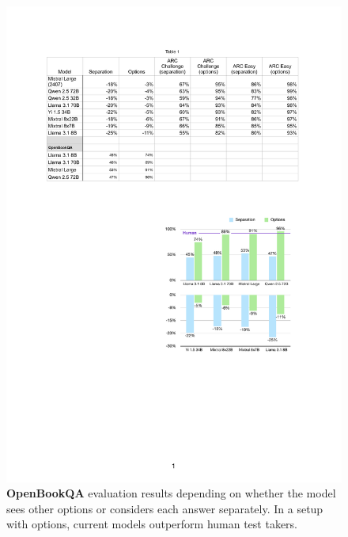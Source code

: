 \documentclass[11pt]{article}
\begin{document}
\begin{figure}[t]
    \centering
    \includegraphics[width=\linewidth]{images/openbookqa.pdf}
    \caption{{\color{snowviolet}\textbf{OpenBookQA}} evaluation results depending on whether the model sees other options or considers each answer separately. In a setup with options, current models outperform human test takers.}
    \label{fig:openbookqa}
\end{figure}
\end{document}
